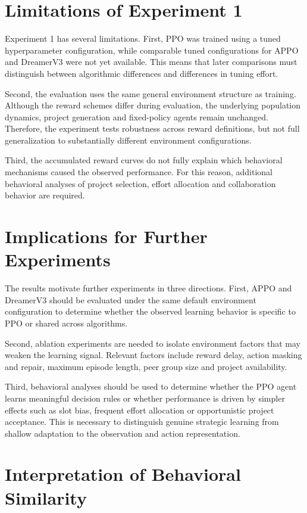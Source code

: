 \documentclass[english,bachelor]{hsluthesis}
\begin{document}
\section{Limitations of Experiment 1}

Experiment 1 has several limitations. First, PPO was trained using a tuned hyperparameter configuration, while comparable tuned configurations for APPO and DreamerV3 were not yet available. This means that later comparisons must distinguish between algorithmic differences and differences in tuning effort.

Second, the evaluation uses the same general environment structure as training. Although the reward schemes differ during evaluation, the underlying population dynamics, project generation and fixed-policy agents remain unchanged. Therefore, the experiment tests robustness across reward definitions, but not full generalization to substantially different environment configurations.

Third, the accumulated reward curves do not fully explain which behavioral mechanisms caused the observed performance. For this reason, additional behavioral analyses of project selection, effort allocation and collaboration behavior are required.

\section{Implications for Further Experiments}

The results motivate further experiments in three directions. First, APPO and DreamerV3 should be evaluated under the same default environment configuration to determine whether the observed learning behavior is specific to PPO or shared across algorithms.

Second, ablation experiments are needed to isolate environment factors that may weaken the learning signal. Relevant factors include reward delay, action masking and repair, maximum episode length, peer group size and project availability.

Third, behavioral analyses should be used to determine whether the PPO agent learns meaningful decision rules or whether performance is driven by simpler effects such as slot bias, frequent effort allocation or opportunistic project acceptance. This is necessary to distinguish genuine strategic learning from shallow adaptation to the observation and action representation.

\section{Interpretation of Behavioral Similarity}
\end{document}
